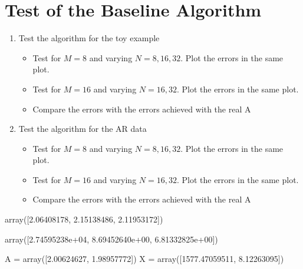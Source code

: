 \section{Test of the Baseline Algorithm}
\begin{enumerate}
\item Test the algorithm for the toy example
	\begin{itemize}
	\item Test for $M = 8$ and varying $N = 8, 16, 32$. Plot the errors in the same plot.
	\item Test for $M = 16$ and varying $N = 16, 32$. Plot the errors in the same plot.
	\item Compare the errors with the errors achieved with the real A
	\end{itemize}	 
\item Test the algorithm for the AR data
	\begin{itemize}
	\item Test for $M = 8$ and varying $N = 8, 16, 32$. Plot the errors in the same plot.
	\item Test for $M = 16$ and varying $N = 16, 32$. Plot the errors in the same plot.
	\item Compare the errors with the errors achieved with the real A
	\end{itemize}	
\end{enumerate}   
array([2.06408178, 2.15138486, 2.11953172])

array([2.74595238e+04, 8.69452640e+00, 6.81332825e+00])


A = array([2.00624627, 1.98957772])
X = array([1577.47059511,    8.12263095])